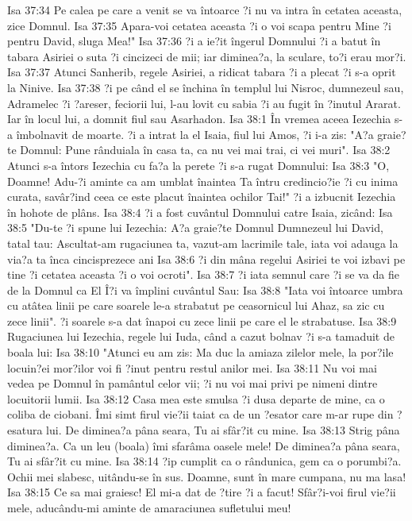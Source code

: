 Isa 37:34  Pe calea pe care a venit se va întoarce ?i nu va intra în cetatea aceasta, zice Domnul.
Isa 37:35  Apara-voi cetatea aceasta ?i o voi scapa pentru Mine ?i pentru David, sluga Mea!"
Isa 37:36  ?i a ie?it îngerul Domnului ?i a batut în tabara Asiriei o suta ?i cincizeci de mii; iar diminea?a, la sculare, to?i erau mor?i.
Isa 37:37  Atunci Sanherib, regele Asiriei, a ridicat tabara ?i a plecat ?i s-a oprit la Ninive.
Isa 37:38  ?i pe când el se închina în templul lui Nisroc, dumnezeul sau, Adramelec ?i ?areser, feciorii lui, l-au lovit cu sabia ?i au fugit în ?inutul Ararat. Iar în locul lui, a domnit fiul sau Asarhadon.
Isa 38:1  În vremea aceea Iezechia s-a îmbolnavit de moarte. ?i a intrat la el Isaia, fiul lui Amos, ?i i-a zis: "A?a graie?te Domnul: Pune rânduiala în casa ta, ca nu vei mai trai, ci vei muri".
Isa 38:2  Atunci s-a întors Iezechia cu fa?a la perete ?i s-a rugat Domnului:
Isa 38:3  "O, Doamne! Adu-?i aminte ca am umblat înaintea Ta întru credincio?ie ?i cu inima curata, savâr?ind ceea ce este placut înaintea ochilor Tai!" ?i a izbucnit Iezechia în hohote de plâns.
Isa 38:4  ?i a fost cuvântul Domnului catre Isaia, zicând:
Isa 38:5  "Du-te ?i spune lui Iezechia: A?a graie?te Domnul Dumnezeul lui David, tatal tau: Ascultat-am rugaciunea ta, vazut-am lacrimile tale, iata voi adauga la via?a ta înca cincisprezece ani
Isa 38:6  ?i din mâna regelui Asiriei te voi izbavi pe tine ?i cetatea aceasta ?i o voi ocroti".
Isa 38:7  ?i iata semnul care ?i se va da fie de la Domnul ca El Î?i va împlini cuvântul Sau:
Isa 38:8  "Iata voi întoarce umbra cu atâtea linii pe care soarele le-a strabatut pe ceasornicul lui Ahaz, sa zic cu zece linii". ?i soarele s-a dat înapoi cu zece linii pe care el le strabatuse.
Isa 38:9  Rugaciunea lui Iezechia, regele lui Iuda, când a cazut bolnav ?i s-a tamaduit de boala lui:
Isa 38:10  "Atunci eu am zis: Ma duc la amiaza zilelor mele, la por?ile locuin?ei mor?ilor voi fi ?inut pentru restul anilor mei.
Isa 38:11  Nu voi mai vedea pe Domnul în pamântul celor vii; ?i nu voi mai privi pe nimeni dintre locuitorii lumii.
Isa 38:12  Casa mea este smulsa ?i dusa departe de mine, ca o coliba de ciobani. Îmi simt firul vie?ii taiat ca de un ?esator care m-ar rupe din ?esatura lui. De diminea?a pâna seara, Tu ai sfâr?it cu mine.
Isa 38:13  Strig pâna diminea?a. Ca un leu (boala) îmi sfarâma oasele mele! De diminea?a pâna seara, Tu ai sfâr?it cu mine.
Isa 38:14  ?ip cumplit ca o rândunica, gem ca o porumbi?a. Ochii mei slabesc, uitându-se în sus. Doamne, sunt în mare cumpana, nu ma lasa!
Isa 38:15  Ce sa mai graiesc! El mi-a dat de ?tire ?i a facut! Sfâr?i-voi firul vie?ii mele, aducându-mi aminte de amaraciunea sufletului meu!

